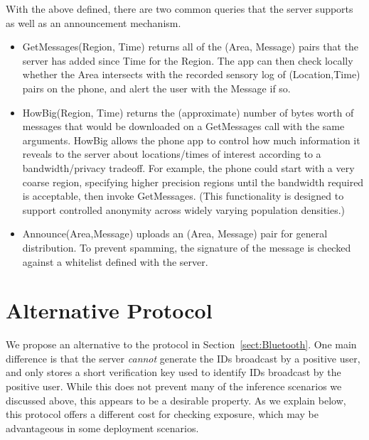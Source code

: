 \documentclass{article}
\begin{document}
With the above defined, there are two common queries that the server supports as well as an announcement mechanism.
\begin{itemize}
    \item GetMessages(Region, Time) returns all of the (Area, Message) pairs that the server has added since Time for the Region. The app can then check locally whether the Area intersects with the recorded sensory log of (Location,Time) pairs on the phone, and alert the user with the Message if so.   
    \item HowBig(Region, Time) returns the (approximate) number of bytes worth of messages that would be downloaded on a GetMessages call with the same arguments.  HowBig allows the phone app to control how much information it reveals to the server about locations/times of interest according to a bandwidth/privacy tradeoff.  For example, the phone could start with a very coarse region, specifying higher precision regions until the bandwidth required is acceptable, then invoke GetMessages.  (This functionality is designed to support controlled anonymity across widely varying population densities.)
    \item Announce(Area,Message) uploads an (Area, Message) pair for general distribution.  To prevent spamming, the signature of the message is checked against a whitelist defined with the server. 
\end{itemize}

\newcommand{\skey}{\mathrm{sk}}
\newcommand{\vkey}{\mathrm{vk}}
\newcommand{\Kg}{\mathsf{Kg}}
\newcommand{\Sign}{\mathsf{Sign}}
\newcommand{\Vrfy}{\mathsf{Vrfy}}
\newcommand{\gps}{\mathrm{coord}}

\section{Alternative Protocol}\label{sect:alternative}

We propose an alternative to the protocol in Section~\ref{sect:Bluetooth}. One main difference is that the server {\em cannot} generate the IDs broadcast by a positive user, and only stores a short verification key used to identify IDs broadcast by the positive user. While this does not prevent many of the inference scenarios we discussed above, this appears to be a desirable property. As we explain below, this protocol offers a different cost for checking exposure, which may be advantageous in some deployment scenarios.
\end{document}

